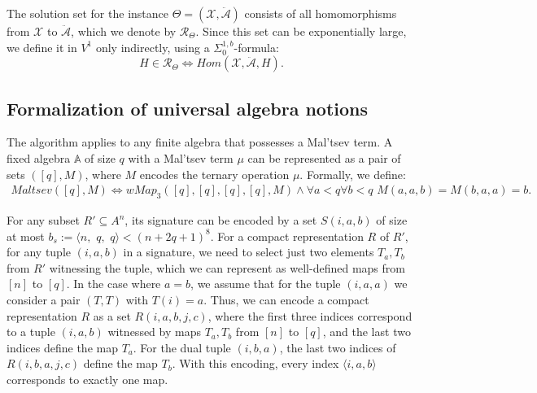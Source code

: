 \documentclass{article}
\theoremstyle{definition}
\theoremstyle{theorem}
\theoremstyle{theorem}
\theoremstyle{remark}
\theoremstyle{remark}
\theoremstyle{example}
\theoremstyle{notation}
\theoremstyle{theorem}
\begin{document}
The solution set for the instance $\Theta = (\mathcal{X}, \ddot{\mathcal{A}})$ consists of all homomorphisms from $\mathcal{X}$ to $\ddot{\mathcal{A}}$, which we denote by $\mathscr{R}_{\Theta}$. Since this set can be exponentially large, we define it in $V^1$ only indirectly, using a $\Sigma^{1,b}_0$-formula:
\begin{equation}
H \in \mathscr{R}_{\Theta} \iff Hom(\mathcal{X}, \ddot{\mathcal{A}}, H).
\end{equation}

\subsection{Formalization of universal algebra notions}\label{askfdh;qweyi}

The algorithm applies to any finite algebra that possesses a Mal'tsev term. A fixed algebra $\mathbb{A}$ of size $q$ with a Mal'tsev term $\mu$ can be represented as a pair of sets $([q], M)$, where $M$ encodes the ternary operation $\mu$. Formally, we define:
\begin{equation}
\begin{gathered}
Maltsev([q], M) \iff wMap_3([q],[q],[q],[q], M) \wedge \forall a<q \forall b<q\,\, M(a,a,b) = M(b,a,a) = b.
\end{gathered}
\end{equation}

For any subset $R'\subseteq A^n$, its signature can be encoded by a set $S(i,a,b)$ of size at most $b_s:=\langle n,$ $q,$ $q\rangle< (n+2q+1)^8$. For a compact representation $R$ of $R'$, for any tuple $(i,a,b)$ in a signature, we need to select just two elements $T_a, T_b$ from $R'$ witnessing the tuple, which we can represent as well-defined maps from $[n]$ to $[q]$. In the case where $a=b$, we assume that for the tuple $(i,a,a)$ we consider a pair $(T,T)$ with $T(i)=a$. Thus, we can encode a compact representation $R$ as a set $R(i,a,b,j,c)$, where the first three indices correspond to a tuple $(i,a,b)$ witnessed by maps $T_a, T_b$ from $[n]$ to $[q]$, and the last two indices define the map $T_a$. For the dual tuple $(i,b,a)$, the last two indices of $R(i,b,a,j,c)$ define the map $T_b$. With this encoding, every index $\langle i,a,b\rangle $ corresponds to exactly one map.
\end{document}
